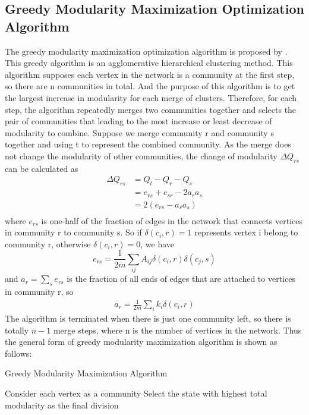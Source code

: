 \documentclass[12pt,oneside,final]{vlsithesis}
\begin{document}
\subsection{Greedy Modularity Maximization Optimization Algorithm}
The greedy modularity maximization optimization algorithm is proposed by \citet{newman2004fast}. This greedy algorithm is an agglomerative hierarchical clustering method.  This algorithm supposes each vertex in the network is  a community at the first step, so there are n communities in total. And the purpose of this algorithm is to get the largest increase in modularity for each merge of clusters. Therefore, for each step, the algorithm repeatedly merges two communities together and selects the pair of communities that leading to the most increase or least decrease of modularity to combine. Suppose we merge community r and community s together and using t to represent the combined community. As the merge does not change the modularity of other communities, the change of modularity $ \Delta Q_{rs} $ can be calculated as
\begin{equation}
\begin{split}
\Delta Q_{rs} & = Q_{t} - Q_{r} - Q_{s} \\
&= e_{rs} + e_{sr} - 2a_{r}a_{s} \\
&= 2(e_{rs}- a_{r}a_{s})\\
\end{split}
\end{equation}
where $e_{rs}$ is one-half of the fraction of edges in the network that connects vertices in community r to community s. So if $\delta(c_{i}, r) =1$ represents vertex i belong to community r, otherwise $\delta(c_{i}, r) = 0$, we have
\begin{equation}
e_{rs} = \frac{1}{2m} \sum_{ij}A_{ij}\delta(c_{i}, r)\delta(c_{j}, s)
\end{equation}
and $a_{r} = \sum_{s}e_{rs}$ is the fraction of all ends of edges that are attached to vertices in community r, so
\begin{eqnarray}
a_{r} = \frac{1}{2m}\sum_{i}k_{i}\delta(c_{i},r)
\end{eqnarray}
The algorithm is terminated when there is just one community left, so there is totally $ n - 1 $ merge steps, where n is the number of vertices in the network. Thus the general form of greedy modularity maximization algorithm is shown as follows:
\begin{algorithm}
	\caption{Greedy Modularity Maximization Algorithm}
	Consider each vertex as a community\;
	Select the state with highest total modularity as the final division\;
\end{algorithm}
\end{document}
